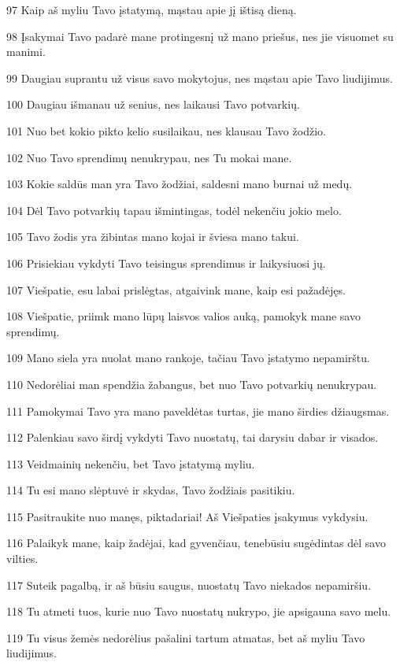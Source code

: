 \par 97 Kaip aš myliu Tavo įstatymą, mąstau apie jį ištisą dieną. 
\par 98 Įsakymai Tavo padarė mane protingesnį už mano priešus, nes jie visuomet su manimi. 
\par 99 Daugiau suprantu už visus savo mokytojus, nes mąstau apie Tavo liudijimus. 
\par 100 Daugiau išmanau už senius, nes laikausi Tavo potvarkių. 
\par 101 Nuo bet kokio pikto kelio susilaikau, nes klausau Tavo žodžio. 
\par 102 Nuo Tavo sprendimų nenukrypau, nes Tu mokai mane. 
\par 103 Kokie saldūs man yra Tavo žodžiai, saldesni mano burnai už medų. 
\par 104 Dėl Tavo potvarkių tapau išmintingas, todėl nekenčiu jokio melo. 
\par 105 Tavo žodis yra žibintas mano kojai ir šviesa mano takui. 
\par 106 Prisiekiau vykdyti Tavo teisingus sprendimus ir laikysiuosi jų. 
\par 107 Viešpatie, esu labai prislėgtas, atgaivink mane, kaip esi pažadėjęs. 
\par 108 Viešpatie, priimk mano lūpų laisvos valios auką, pamokyk mane savo sprendimų. 
\par 109 Mano siela yra nuolat mano rankoje, tačiau Tavo įstatymo nepamirštu. 
\par 110 Nedorėliai man spendžia žabangus, bet nuo Tavo potvarkių nenukrypau. 
\par 111 Pamokymai Tavo yra mano paveldėtas turtas, jie mano širdies džiaugsmas. 
\par 112 Palenkiau savo širdį vykdyti Tavo nuostatų, tai darysiu dabar ir visados. 
\par 113 Veidmainių nekenčiu, bet Tavo įstatymą myliu. 
\par 114 Tu esi mano slėptuvė ir skydas, Tavo žodžiais pasitikiu. 
\par 115 Pasitraukite nuo manęs, piktadariai! Aš Viešpaties įsakymus vykdysiu. 
\par 116 Palaikyk mane, kaip žadėjai, kad gyvenčiau, tenebūsiu sugėdintas dėl savo vilties. 
\par 117 Suteik pagalbą, ir aš būsiu saugus, nuostatų Tavo niekados nepamiršiu. 
\par 118 Tu atmeti tuos, kurie nuo Tavo nuostatų nukrypo, jie apsigauna savo melu. 
\par 119 Tu visus žemės nedorėlius pašalini tartum atmatas, bet aš myliu Tavo liudijimus. 
